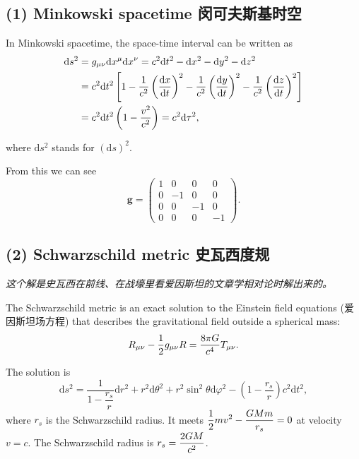 \subsection*{(1) Minkowski spacetime
闵可夫斯基时空}\label{minkowski-spacetime-ux95f5ux53efux592bux65afux57faux65f6ux7a7a-1}

In Minkowski spacetime, the space-time interval can be written as
\begin{align*}
    \mathrm{d} s^2 & = g_{\mu\nu} \mathrm{d}x^{\mu} \mathrm{d}x^{\nu} = c^2 \mathrm{d}t^2 - \mathrm{d} x^2 - \mathrm{d} y^2 - \mathrm{d} z^2 \\
    & = c^2 \mathrm{d}t^2 \left[ 1 - \frac{1}{c^2} \left( \frac{\mathrm{d}x}{\mathrm{d}t} \right)^2 - \frac{1}{c^2} \left( \frac{\mathrm{d}y}{\mathrm{d}t} \right)^2 - \frac{1}{c^2} \left( \frac{\mathrm{d}z}{\mathrm{d}t} \right)^2 \right] \\
    & = c^2 \mathrm{d}t^2 \left( 1 - {v^2 \over c^2} \right) = c^2 \mathrm{d} \tau^2,
\end{align*}

where \(\mathrm{d} s^2\) stands for \((\mathrm{d} s)^2\).

From this we can see \[\mathbf{g} = \begin{pmatrix}
    1 & 0 & 0 & 0 \\
    0 & -1 & 0 & 0 \\
    0 & 0 & -1 & 0 \\
    0 & 0 & 0 & -1
\end{pmatrix}.\]

\subsection*{(2) Schwarzschild metric
史瓦西度规}\label{schwarzschild-metric-ux53f2ux74e6ux897fux5ea6ux89c4}

\emph{这个解是史瓦西在前线、在战壕里看爱因斯坦的文章学相对论时解出来的。}

The Schwarzschild metric is an exact solution to the Einstein field
equations (爱因斯坦场方程) that describes the gravitational field
outside a spherical mass:
\[R_{\mu\nu} - {1 \over 2} g_{\mu\nu} R = {8 \pi G \over c^4} T_{\mu\nu}.\]

The solution is
\[\mathrm{d}s^2 = \dfrac{1}{1 - \dfrac{r_s}{r}} \mathrm{d}r^2 + r^2 \mathrm{d} \theta^2 + r^2 \sin^2 \theta \mathrm{d} \varphi^2 - \left( 1 - \dfrac{r_s}{r} \right) c^2 \mathrm{d}t^2,\]
where \(r_s\) is the Schwarzschild radius. It meets
\(\displaystyle {1 \over 2} m v^2 - {GMm \over r_s} = 0\) at velocity \(v = c\). The
Schwarzschild radius is \(\displaystyle r_s = {2GM \over c^2}\).

